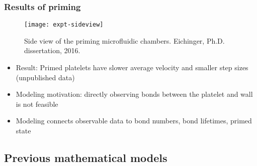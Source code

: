 \documentclass{beamer}
\begin{document}
\begin{frame}
  \frametitle{Results of priming}
  \begin{figure}
    \centering
    \texttt{[image: expt-sideview]}
    \caption{Side view of the priming microfluidic
      chambers. Eichinger, Ph.D. dissertation, 2016.}
  \end{figure}
  \begin{itemize}
  \item Result: Primed platelets have slower average velocity and
    smaller step sizes (unpublished data)
  \item Modeling motivation: directly observing bonds between the
    platelet and wall is not feasible
  \item Modeling connects observable data to bond numbers, bond
    lifetimes, primed state
  \end{itemize}
\end{frame}

%         


\subsection{Previous mathematical models}
\end{document}
